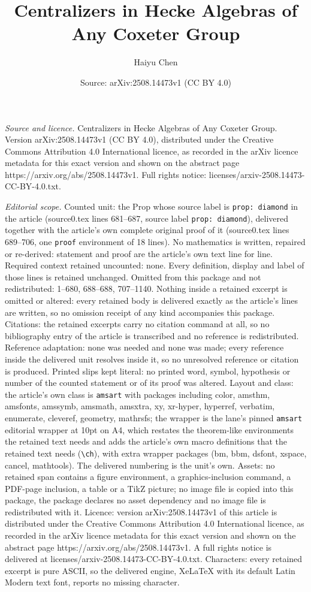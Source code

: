 \documentclass[10pt,a4paper]{amsart}
\title[Centralizers in Hecke Algebras of Any Coxeter Group]{Centralizers in Hecke Algebras of Any Coxeter Group}
\author{Haiyu Chen}
\date{Source: arXiv:2508.14473v1 (CC BY 4.0)}
\begin{document}
\maketitle

\noindent\emph{Source and licence.} Centralizers in Hecke Algebras of Any Coxeter Group. Version arXiv:2508.14473v1 (CC BY 4.0), distributed under the Creative Commons Attribution 4.0 International licence, as recorded in the arXiv licence metadata for this exact version and shown on the abstract page https://arxiv.org/abs/2508.14473v1. Full rights notice: licenses/arxiv-2508.14473-CC-BY-4.0.txt.\par\smallskip

\noindent\textit{Editorial scope.} Counted unit: the Prop whose source label is \texttt{prop: diamond} in the article (source0.tex lines 681--687, source label \texttt{prop: diamond}), delivered together with the article's own complete original proof of it (source0.tex lines 689--706, one \texttt{proof} environment of 18 lines). No mathematics is written, repaired or re-derived: statement and proof are the article's own text line for line. Required context retained uncounted: none. Every definition, display and label of those lines is retained unchanged. Omitted from this package and not redistributed: 1--680, 688--688, 707--1140. Nothing inside a retained excerpt is omitted or altered: every retained body is delivered exactly as the article's lines are written, so no omission receipt of any kind accompanies this package. Citations: the retained excerpts carry no citation command at all, so no bibliography entry of the article is transcribed and no reference is redistributed. Reference adaptation: none was needed and none was made; every reference inside the delivered unit resolves inside it, so no unresolved reference or citation is produced. Printed slips kept literal: no printed word, symbol, hypothesis or number of the counted statement or of its proof was altered. Layout and class: the article's own class is \texttt{amsart} with packages including color, amsthm, amsfonts, amssymb, amsmath, amsxtra, xy, xr-hyper, hyperref, verbatim, enumerate, cleveref, geometry, mathrsfs; the wrapper is the lane's pinned \texttt{amsart} editorial wrapper at 10pt on A4, which restates the theorem-like environments the retained text needs and adds the article's own macro definitions that the retained text needs (\texttt{\textbackslash ch}), with extra wrapper packages (bm, bbm, dsfont, xspace, cancel, mathtools). The delivered numbering is the unit's own. Assets: no retained span contains a figure environment, a graphics-inclusion command, a PDF-page inclusion, a table or a TikZ picture; no image file is copied into this package, the package declares no asset dependency and no image file is redistributed with it. Licence: version arXiv:2508.14473v1 of this article is distributed under the Creative Commons Attribution 4.0 International licence, as recorded in the arXiv licence metadata for this exact version and shown on the abstract page https://arxiv.org/abs/2508.14473v1. A full rights notice is delivered at licenses/arxiv-2508.14473-CC-BY-4.0.txt. Characters: every retained excerpt is pure ASCII, so the delivered engine, XeLaTeX with its default Latin Modern text font, reports no missing character.
\end{document}
